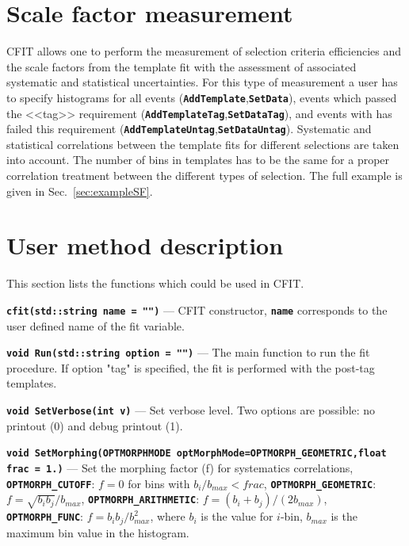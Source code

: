 \documentclass[12pt]{article}
\newcommand\verbbf[1]{\textcolor[rgb]{0,0,1}{\texttt{\textbf{#1}}}}
\newcommand\verbbfb[1]{\textcolor[rgb]{0,0,0}{\texttt{\textbf{#1}}}}
\begin{document}
\section{Scale factor measurement}

CFIT allows one to perform the measurement of selection criteria efficiencies and the
scale factors from the template fit with the assessment of associated systematic and
statistical uncertainties. For this type of measurement a user has to
specify histograms for all events
(\verbbf{AddTemplate},\verbbf{SetData}), events which passed
the <<tag>> requirement (\verbbf{AddTemplateTag},\verbbf{SetDataTag}), and events with has failed
this requirement (\verbbf{AddTemplateUntag},\verbbf{SetDataUntag}).
Systematic and statistical correlations between the
template fits for different selections are
taken into account. The number of bins in templates has to be the same
for a proper correlation treatment between the different types of selection.
The full example is given in Sec.~\ref{sec:exampleSF}.

\section{User method description}

This section lists the functions which could be used in CFIT.

\vspace{0.3cm}

\noindent \verbbf{cfit(std::string name = "")} --- CFIT constructor,
\verbbfb{name} corresponds to the user defined name of the fit variable.

\vspace{0.3cm}

\noindent \verbbf{void Run(std::string option = "")} --- The main function to run the fit
procedure. If option "tag" is specified, the fit is performed with the post-tag templates.

\vspace{0.3cm}

\noindent \verbbf{void SetVerbose(int v)} --- Set verbose level. 
Two options are possible: no printout (0) and debug printout (1).

\vspace{0.3cm}

\noindent \verbbf{void SetMorphing(OPTMORPHMODE optMorphMode=OPTMORPH\_GEOMETRIC,float frac = 1.)} ---
Set the morphing factor (f) for systematics correlations,
\verbbfb{OPTMORPH\_CUTOFF}: $f=0$ for bins with $b_{i}/b_{max} < frac$, 
\verbbfb{OPTMORPH\_GEOMETRIC}: $f=\sqrt{b_{i}b_{j}}/b_{max}$,
\verbbfb{OPTMORPH\_ARITHMETIC}: $f=(b_{i}+b_{j})/(2 b_{max})$,
\verbbfb{OPTMORPH\_FUNC}: $f=b_{i}b_{j}/b_{max}^{2}$, where $b_{i}$ is
the value for $i$-bin, $b_{max}$ is the maximum bin value in the
histogram.
\end{document}
